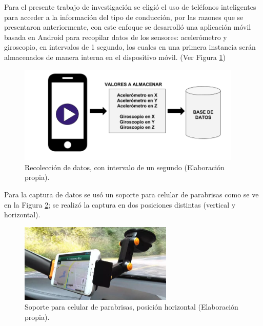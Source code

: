 \vspace{5mm} %

Para el presente trabajo de investigaci\'{o}n se eligi\'{o} el uso de tel\'{e}fonos inteligentes para acceder a la informaci\'{o}n del tipo de conducci\'{o}n, por las razones que se presentaron anteriormente, con este enfoque se desarroll\'{o} una aplicaci\'{o}n m\'{o}vil basada en Android para recopilar datos de los sensores: aceler\'{o}metro y giroscopio, en intervalos de 1 segundo, los cuales en una primera instancia ser\'{a}n almacenados de manera interna en el dispositivo m\'{o}vil. (Ver Figura \ref{fig:captura})

\vspace{5mm} %

\begin{figure}[h!]
  \begin{center}	\includegraphics[width=0.95\textwidth,frame]{imagenes/Cap3/captura}
  \caption{Recolecci\'{o}n de datos, con intervalo de un segundo (Elaboraci\'{o}n propia).}
  \label{fig:captura}
  \end{center}
\end{figure}

\vspace{5mm} %

Para la captura de datos se us\'{o} un soporte para celular de parabrisas como se ve en la Figura \ref{fig:soporte}; se realiz\'{o} la captura en dos posiciones distintas (vertical y horizontal).
\vspace{5mm} %

\begin{figure}[h!]
  \begin{center}	\includegraphics[width=0.65\textwidth,frame]{imagenes/Cap3/soporte}
  \caption{Soporte para celular de parabrisas, posici\'{o}n horizontal (Elaboraci\'{o}n propia).}
  \label{fig:soporte}
  \end{center}
\end{figure}

